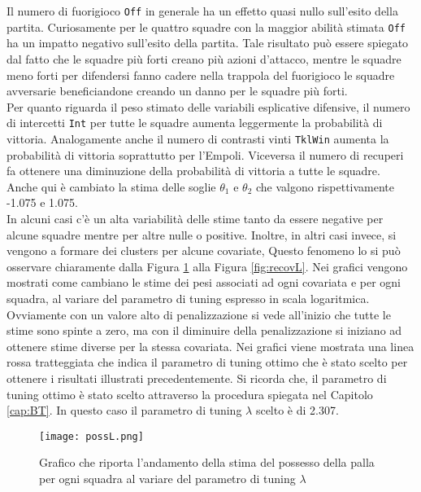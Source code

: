 Il numero di fuorigioco \texttt{Off} in generale ha un effetto quasi nullo sull'esito della partita. Curiosamente per le quattro squadre con la maggior abilità stimata \texttt{Off} ha un impatto negativo sull'esito della partita. Tale risultato può essere spiegato dal fatto che le squadre più forti creano più azioni d'attacco, mentre le squadre meno forti per difendersi fanno cadere nella trappola del fuorigioco le squadre avversarie beneficiandone creando un danno per le squadre più forti.\\
Per quanto riguarda il peso stimato delle variabili esplicative difensive, il numero di intercetti \texttt{Int} per tutte le squadre aumenta leggermente la probabilità di vittoria. Analogamente anche il numero di contrasti vinti \texttt{TklWin} aumenta la probabilità di vittoria soprattutto per l'Empoli. Viceversa il numero di recuperi fa ottenere una diminuzione della probabilità di vittoria a tutte le squadre.\\
Anche qui è cambiato la stima delle soglie $\theta_1$ e $\theta_2$ che valgono rispettivamente -1.075 e 1.075.\\
In alcuni casi c'è un alta variabilità delle stime tanto da essere negative per alcune squadre mentre per altre nulle o positive. Inoltre, in altri casi invece, si vengono a formare dei clusters per alcune covariate,  Questo fenomeno lo si può osservare chiaramente dalla Figura \ref{fig:possL} alla Figura \ref{fig:recovL}. Nei grafici vengono mostrati come cambiano le stime dei pesi associati ad ogni covariata e per ogni squadra, al variare del parametro di tuning espresso in scala logaritmica. Ovviamente con un valore alto di penalizzazione si vede all'inizio che tutte le stime sono spinte a zero, ma con il diminuire della penalizzazione si iniziano ad ottenere stime diverse per la stessa covariata. Nei grafici viene mostrata una linea rossa tratteggiata che indica il parametro di tuning ottimo che è stato scelto per ottenere i risultati illustrati precedentemente. Si ricorda che, il parametro di tuning ottimo è stato scelto attraverso la procedura spiegata nel Capitolo \ref{cap:BT}. In questo caso il parametro di tuning $\lambda$ scelto è di 2.307.\\

\begin{figure}[htbp]
	\begin{center}
		\texttt{[image: possL.png]}
		\caption{Grafico che riporta l'andamento della stima del possesso della palla per ogni squadra al variare del parametro di tuning $\lambda$} \label{fig:possL}
	\end{center}
\end{figure}

